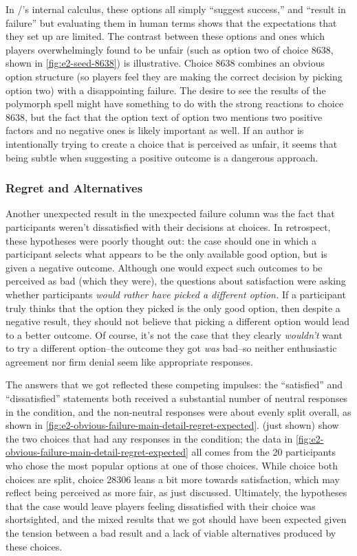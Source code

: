 In \dunyazad/'s internal calculus, these options all simply ``suggest success,'' and ``result in failure'' but evaluating them in human terms shows that the expectations that they set up are limited.
%
The contrast between these options and ones which players overwhelmingly found to be unfair (such as option two of choice 8638, shown in \cref{fig:e2-seed-8638}) is illustrative.
%
Choice 8638 combines an obvious option structure (so players feel they are making the correct decision by picking option two) with a disappointing failure.
%
The desire to see the results of the polymorph spell might have something to do with the strong reactions to choice 8638, but the fact that the option text of option two mentions two positive factors and no negative ones is likely important as well.
%
If an author is intentionally trying to create a choice that is perceived as unfair, it seems that being subtle when suggesting a positive outcome is a dangerous approach.


\subsubsection{Regret and Alternatives}

Another unexpected result in the unexpected failure column was the fact that participants weren't dissatisfied with their decisions at \obvf{} choices.
%
In retrospect, these hypotheses were poorly thought out: the \obvfm{} case should one in which a participant selects what appears to be the only available good option, but is given a negative outcome.
%
Although one would expect such outcomes to be perceived as bad (which they were), the questions about satisfaction were asking whether participants \emph{would rather have picked a different option.}
%
If a participant truly thinks that the option they picked is the only good option, then despite a negative result, they should not believe that picking a different option would lead to a better outcome.
%
Of course, it's not the case that they clearly \emph{wouldn't} want to try a different option--the outcome they got \emph{was} bad--so neither enthusiastic agreement nor firm denial seem like appropriate responses.


The answers that we got reflected these competing impulses: the ``satisfied'' and ``dissatisfied'' statements both received a substantial number of neutral responses in the \obvfm{} condition, and the non-neutral responses were about evenly split overall, as shown in \cref{fig:e2-obvious-failure-main-detail-regret-expected}.
%
 (just shown) show the two choices that had any \casem{} responses in the \obvf{} condition; the data in \cref{fig:e2-obvious-failure-main-detail-regret-expected} all comes from the 20 participants who chose the most popular options at one of those choices.
%
While choice both choices are split, choice 28306 leans a bit more towards satisfaction, which may reflect being perceived as more fair, as just discussed.
%
Ultimately, the hypotheses that the \obvfm{} case would leave players feeling dissatisfied with their choice was shortsighted, and the mixed results that we got should have been expected given the tension between a bad result and a lack of viable alternatives produced by these choices.


